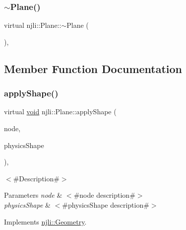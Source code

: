 \subsubsection{\texorpdfstring{$\sim$\+Plane()}{~Plane()}}
{\footnotesize\ttfamily virtual njli\+::\+Plane\+::$\sim$\+Plane (\begin{DoxyParamCaption}{ }\end{DoxyParamCaption})\hspace{0.3cm}{\ttfamily [protected]}, {\ttfamily [virtual]}}



\subsection{Member Function Documentation}
\mbox{\label{classnjli_1_1_plane_a12d8dcbd747c9d03aba34dbf864e4478}} 
\subsubsection{\texorpdfstring{apply\+Shape()}{applyShape()}}
{\footnotesize\ttfamily virtual \mbox{\hyperlink{_thread_8h_af1e856da2e658414cb2456cb6f7ebc66}{void}} njli\+::\+Plane\+::apply\+Shape (\begin{DoxyParamCaption}\item[{\mbox{\hyperlink{classnjli_1_1_node}{Node}} $\ast$}]{node,  }\item[{\mbox{\hyperlink{classnjli_1_1_physics_shape}{Physics\+Shape}} $\ast$}]{physics\+Shape }\end{DoxyParamCaption})\hspace{0.3cm}{\ttfamily [protected]}, {\ttfamily [virtual]}}

$<$\#\+Description\#$>$


\begin{DoxyParams}{Parameters}
{\em node} & $<$\#node description\#$>$ \\
\hline
{\em physics\+Shape} & $<$\#physics\+Shape description\#$>$ \\
\hline
\end{DoxyParams}


Implements \mbox{\hyperlink{classnjli_1_1_geometry_a6661dda8bb03d0f3d6e9764760b6b13f}{njli\+::\+Geometry}}.

\mbox{\label{classnjli_1_1_plane_a258b4f6236afdeb8a1fc64090853dd1d}} 
